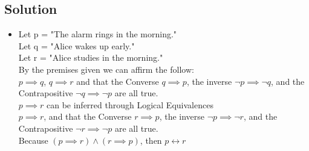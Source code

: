 \documentclass[11pt]{article}
\begin{document}
    \subsection*{Solution}
    \begin{itemize}
        \item[] Let p = "The alarm rings in the morning." \\
                Let q = "Alice wakes up early." \\
                Let r = "Alice studies in the morning." \\
                By the premises given we can affirm the follow: \\
                \(p \implies q\), \(q \implies r\) and that the Converse \(q \implies p\), the inverse \(\neg p \implies \neg q\), and the Contrapositive \(\neg q \implies \neg p\) are all true. \\
                \(p \implies r\) can be inferred through Logical Equivalences \\
                \(p \implies r\), and that the Converse \(r \implies p\), the inverse \(\neg p \implies \neg r\), and the Contrapositive \(\neg r \implies \neg p\) are all true. \\
                Because \((p \implies r) \land( r \implies p)\), then \(p \leftrightarrow r\)
    \end{itemize}
\end{document}
